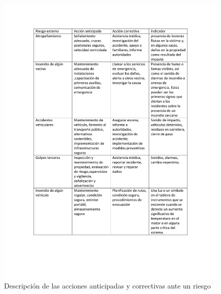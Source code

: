     \begin{figure}[H]
        \centering
        \includegraphics[trim = {20mm 30mm 20mm 15mm},clip,scale=0.45]{29/img/accionesAnticipadas.pdf}
        \caption{Descripción de las acciones anticipadas y correctivas ante un riesgo }
        \label{fig:accionesAnticipadas.pdf}
    \end{figure}
    
